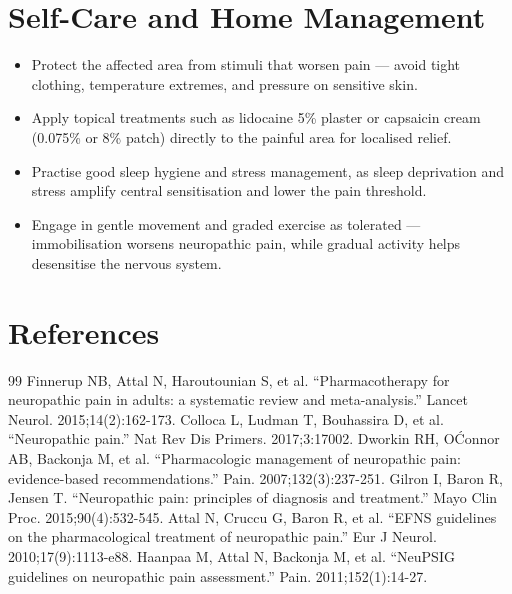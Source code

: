 \section*{Self-Care and Home Management}
\begin{itemize}
  \item Protect the affected area from stimuli that worsen pain — avoid tight clothing, temperature extremes, and pressure on sensitive skin.
  \item Apply topical treatments such as lidocaine 5\% plaster or capsaicin cream (0.075\% or 8\% patch) directly to the painful area for localised relief.
  \item Practise good sleep hygiene and stress management, as sleep deprivation and stress amplify central sensitisation and lower the pain threshold.
  \item Engage in gentle movement and graded exercise as tolerated — immobilisation worsens neuropathic pain, while gradual activity helps desensitise the nervous system.
\end{itemize}

\section*{References}
\begin{thebibliography}{99}
 Finnerup NB, Attal N, Haroutounian S, et al. ``Pharmacotherapy for neuropathic pain in adults: a systematic review and meta-analysis.'' Lancet Neurol. 2015;14(2):162-173.
 Colloca L, Ludman T, Bouhassira D, et al. ``Neuropathic pain.'' Nat Rev Dis Primers. 2017;3:17002.
 Dworkin RH, O\'Connor AB, Backonja M, et al. ``Pharmacologic management of neuropathic pain: evidence-based recommendations.'' Pain. 2007;132(3):237-251.
 Gilron I, Baron R, Jensen T. ``Neuropathic pain: principles of diagnosis and treatment.'' Mayo Clin Proc. 2015;90(4):532-545.
 Attal N, Cruccu G, Baron R, et al. ``EFNS guidelines on the pharmacological treatment of neuropathic pain.'' Eur J Neurol. 2010;17(9):1113-e88.
 Haanpaa M, Attal N, Backonja M, et al. ``NeuPSIG guidelines on neuropathic pain assessment.'' Pain. 2011;152(1):14-27.
\end{thebibliography}
